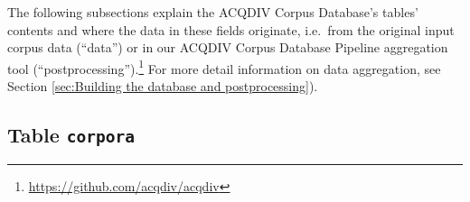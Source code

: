 \documentclass[a4paper, 11pt]{book}
\newcommand{\und}{\underline{{ }}\hspace{0.2mm}}	%
\begin{document}

\noindent The following subsections explain the ACQDIV Corpus Database's tables' contents and where the data in these fields originate, i.e.\ from the original input corpus data (``data'') or in our ACQDIV Corpus Database Pipeline aggregation tool (``postprocessing'').\footnote{\url{https://github.com/acqdiv/acqdiv}} For more detail information on data aggregation, see Section \ref{sec:Building the database and postprocessing}).


\subsection{Table \texttt{corpora}}
\label{subsec:Table corpora}
\end{document}
